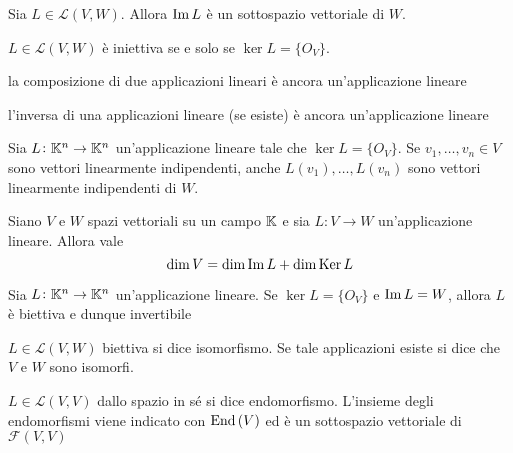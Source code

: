 \begin{thm}
	Sia $ L \in \mathscr{L}{(V, W)} $. Allora $ \operatorname{Im}{L} $ è un sottospazio vettoriale di $ W $.
\end{thm}

\begin{thm}
	$ L \in \mathscr{L}{(V, W)} $ è iniettiva se e solo se $ \ker{L} = \{O_V\} $.
\end{thm}

\begin{thm}
	\textsf{la composizione di due applicazioni lineari è ancora un'applicazione lineare}
\end{thm}

\begin{thm}
	\textsf{l'inversa di una applicazioni lineare (se esiste) è ancora un'applicazione lineare}
\end{thm}

\begin{thm}
	Sia $ L \colon \mathbb{K}^n \to \mathbb{K}^n $ un'applicazione lineare tale che $ \ker{L} = \{O_V\} $. Se $ v_1, \ldots, v_n \in V $ sono vettori linearmente indipendenti, anche $ L(v_1), \ldots, L(v_n) $ sono vettori linearmente indipendenti di $ W $.
\end{thm}

\begin{thm}
	Siano $ V $ e $ W $ spazi vettoriali su un campo $ \mathbb{K} $ e sia $ L \colon V \to W $  un'applicazione lineare. Allora vale \[\dim{V} = \dim{\operatorname{Im}{L}} + \dim{\operatorname{Ker}{L}}\]
\end{thm}

\begin{thm}
	Sia $ L \colon \mathbb{K}^n \to \mathbb{K}^n $ un'applicazione lineare. Se $ \ker{L} = \{O_V\} $ e $ \operatorname{Im}{L} = W $, allora $ L $ è biettiva e dunque invertibile
\end{thm}

\begin{definition}[isomorfismo]
	$ L \in \mathscr{L}{(V, W)} $ biettiva si dice isomorfismo. Se tale applicazioni esiste si dice che $ V $ e $ W $ sono isomorfi.
\end{definition}

\begin{definition}[endomorfismo]
	$ L \in \mathscr{L}{(V, V)} $ dallo spazio in sé si dice endomorfismo. L'insieme degli endomorfismi viene indicato con $ \operatorname{End}{(V)} $ ed è un sottospazio vettoriale di $ \mathscr{F}{(V, V)} $
\end{definition}

